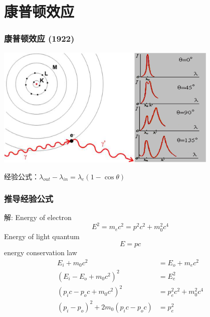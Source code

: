 \section{康普顿效应}

\begin{frame}   
    \frametitle{康普顿效应 (1922)}
    \begin{center}
        \includegraphics[width=0.8\textwidth]{figs/compton.png}
    \end{center}  
    经验公式：$\lambda_{out}-\lambda_{in}=\lambda_e(1-\cos \theta)$
\end{frame}

\begin{frame}  
    \frametitle{推导经验公式} 
    \alert{解:} Energy of electron 
    \begin{equation*}
        E^2 =m_ec^2=p^2c^2 +m_0 ^2 c^4 
    \end{equation*}
    Energy of light quantum
    \begin{equation*}
        E =pc 
    \end{equation*}
    energy conservation law
    \begin{equation*}
        \begin{split}
        E_i + m_0 c^2 &= E_o + m_ec^2 \\
        (E_i -E_o + m_0 c^2)^2 &= E_e ^2\\
        (p_i c-p_o c + m_0 c^2) ^2 &= p_e ^2 c^2 +m_0 ^2 c^4 \\
        (p_i-p_o)^2 +2 m_0 (p_i c-p_o c) &= p_e ^2
    \end{split}
    \end{equation*}
\end{frame}

